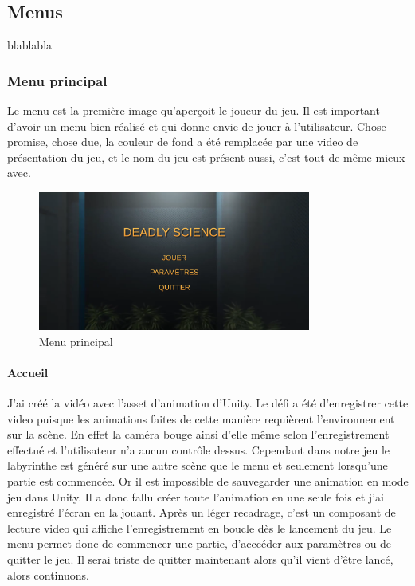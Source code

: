 \documentclass{article}
\begin{document}
\subsection{Menus}
blablabla
\subsubsection{Menu principal}

Le menu est la première image qu'aperçoit le joueur du jeu. Il est important d'avoir un menu bien réalisé et qui donne envie de jouer à l'utilisateur. Chose promise, chose due, la couleur de fond a été remplacée par une video de présentation du jeu, et le nom du jeu est présent aussi, c'est tout de même mieux avec.

\begin{figure}[!h]
	\centering
	\includegraphics[width=0.8\textwidth]{MainMenu.png}
	\caption{Menu principal}
	\label{Menu principal}
\end{figure}

\paragraph{Accueil}
J'ai créé la vidéo avec l'asset d'animation d'Unity. Le défi a été d'enregistrer cette video puisque les animations faites de cette manière requièrent l'environnement sur la scène. En effet la caméra bouge ainsi d'elle même selon l'enregistrement effectué et l'utilisateur n'a aucun contrôle dessus. Cependant dans notre jeu le labyrinthe est généré sur une autre scène que le menu et seulement lorsqu'une partie est commencée. Or il est impossible de sauvegarder une animation en mode jeu dans Unity. Il a donc fallu créer toute l'animation en une seule fois et j'ai enregistré l'écran en la jouant. Après un léger recadrage, c'est un composant de lecture video qui affiche l'enregistrement en boucle dès le lancement du jeu.
\newline
Le menu permet donc de commencer une partie, d'acccéder aux paramètres ou de quitter le jeu. Il serai triste de quitter maintenant alors qu'il vient d'être lancé, alors continuons.
\end{document}
